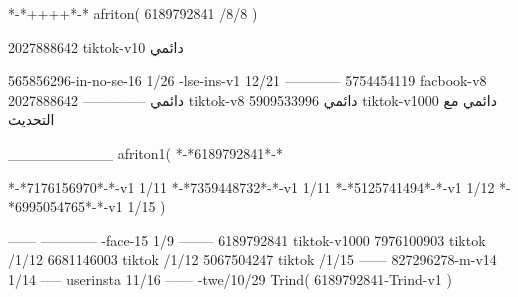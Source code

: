 *-*++++*-*
afriton(
6189792841 /8/8
)

2027888642 tiktok-v10
دائمي

565856296-in-no-se-16 1/26
-lse-ins-v1 12/21
------------
5754454119 facbook-v8
دائمي
--------------
2027888642 tiktok-v8
دائمي
5909533996 tiktok-v1000
دائمي مع التحديث

__________
afriton1(
*-*6189792841*-*

*-*7176156970*-*-v1 1/11
*-*7359448732*-*-v1 1/11
*-*5125741494*-*-v1 1/12
*-*6995054765*-*-v1 1/15
)

------
------------
-face-15 1/9
--------
6189792841 tiktok-v1000
7976100903 tiktok /1/12
6681146003 tiktok /1/12
5067504247 tiktok /1/15
------
827296278-m-v14 1/14
-----
userinsta 11/16
------
-twe/10/29
Trind(
6189792841-Trind-v1 
)
